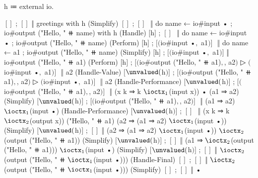 \begin{snippet}[caption={Handle greetings with standard \IO}]
h ≔ external io.

$[]$ ; $[]$ ‖ greetings with h
(Simplify)
$[]$ ; $[]$ $ $
  $ $‖ do { name ← io#input •
       ; io#output ("Hello, " ⧺ name) } with h
(Handle)
$[$h$]$ ; $[]$ $ $
  $ $‖ do { name ← io#input •
       ; io#output ("Hello, " ⧺ name) }
(Perform)
$[$h$]$ ; $[$$($io#input •$,$ a1$)$$]$ $ $
$ $‖ do { name ← a1
     ; io#output ("Hello, " ⧺ name) }
(Simplify)
$[$h$]$ ; $[$$($io#input •$,$ a1$)$$]$ ‖ io#output ("Hello, " ⧺ a1)
(Perform)
$[$h$]$ ; $[$$($io#output ("Hello, " ⧺ a1)$,$, a2$)$
    ▷ $($io#input •$,$ a1$)$$]$ $ $
  $ $‖ a2
(Handle-Value)
$[$$\unvalued($h$)$$]$ ; $[$$($io#output ("Hello, " ⧺ a1)$,$, a2$)$
            ▷ $($io#input •$,$ a1$)$$]$ $ $
  $ $‖ a2
(Handle-Performance)
$[$$\unvalued($h$)$$]$ ; $[$$($io#output ("Hello, " ⧺ a1)$,$, a2$)$$]$ $ $
  $ $‖ (x k ⇒ k $\ioctx_1$(input x)) • (a1 ⇒ a2)
(Simplify)
$[$$\unvalued($h$)$$]$ ; $[$$($io#output ("Hello, " ⧺ a1)$,$, a2$)$$]$ $ $
  $ $‖ (a1 ⇒ a2) $\ioctx_1$(input •)
(Handle-Performance)
$[$$\unvalued($h$)$$]$ ; $[]$ $ $
  $ $‖ (x k ⇒ k $\ioctx_2$(output x)) ("Hello, " ⧺ a1) (a2 ⇒ (a1 ⇒ a2) $\ioctx_1$(input •))
(Simplify)
$[$$\unvalued($h$)$$]$ ; $[]$ ‖ (a2 ⇒ (a1 ⇒ a2) $\ioctx_1$(input •)) $\ioctx_2$(output ("Hello, " ⧺ a1))
(Simplify)
$[$$\unvalued($h$)$$]$ ; $[]$ ‖ (a1 ⇒ $\ioctx_2$(output ("Hello, " ⧺ a1))) $\ioctx_1$(input •)
(Simplify)
$[$$\unvalued($h$)$$]$ ; $[]$ ‖ $\ioctx_2$(output ("Hello, " ⧺ $\ioctx_1$(input •)))
(Handle-Final)
$[]$ ; $[]$ ‖ $\ioctx_2$(output ("Hello, " ⧺ $\ioctx_1$(input •)))
(Simplify)
$[]$ ; $[]$ ‖ •
\end{snippet}
